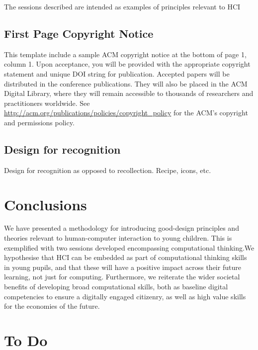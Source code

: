 \documentclass{sig-alternate}
\begin{document}
The sessions described are intended as examples of principles relevant to HCI  


\subsection{First Page Copyright Notice}
This template include a sample ACM copyright notice at the bottom of
page 1, column 1.  Upon acceptance, you will be provided with the
appropriate copyright statement and unique DOI string for publication.
Accepted papers will be distributed in the conference
publications. They will also be placed in the ACM Digital Library,
where they will remain accessible to thousands of researchers and
practitioners worldwide. See
\url{http://acm.org/publications/policies/copyright_policy} for the
ACM’s copyright and permissions policy.


\subsection{Design for recognition}
Design for recognition as opposed to recollection. 
Recipe, icons, etc.


\section{Conclusions}
We have presented a methodology for introducing good-design principles and theories relevant to human-computer interaction to young children. This is exemplified with two sessions developed encompassing computational thinking.We hypothesise that HCI can be embedded as part of computational thinking skills in young pupils, and that these will have a positive impact across their future learning, not just for computing. Furthermore, we reiterate the wider societal benefits of developing broad computational skills, both as baseline digital competencies to ensure a digitally engaged citizenry, as well as high value skills for the economies of the future.






\section*{To Do}
\end{document}

